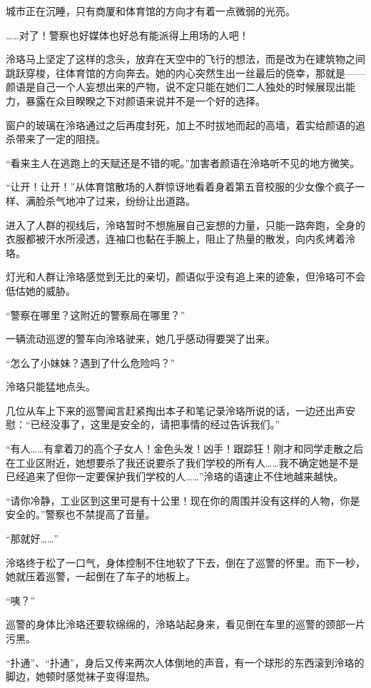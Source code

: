 \documentclass[UTF8, scheme = chinese, openany]{ctexbook}
\begin{document}
城市正在沉睡，只有商厦和体育馆的方向才有着一点微弱的光亮。

……对了！警察也好媒体也好总有能派得上用场的人吧！

泠珞马上坚定了这样的念头，放弃在天空中的飞行的想法，而是改为在建筑物之间跳跃穿梭，往体育馆的方向奔去。她的内心突然生出一丝最后的侥幸，那就是——颜语是自己一个人妄想出来的产物，说不定只能在她们二人独处的时候展现出能力，暴露在众目睽睽之下对颜语来说并不是一个好的选择。

窗户的玻璃在泠珞通过之后再度封死，加上不时拔地而起的高墙，着实给颜语的追杀带来了一定的阻挠。

“看来主人在逃跑上的天赋还是不错的呢。”加害者颜语在泠珞听不见的地方微笑。

\vspace{1.5em}

“让开！让开！”从体育馆散场的人群惊讶地看着身着第五音校服的少女像个疯子一样、满脸杀气地冲了过来，纷纷让出道路。

进入了人群的视线后，泠珞暂时不想施展自己妄想的力量，只能一路奔跑，全身的衣服都被汗水所浸透，连袖口也黏在手腕上，阻止了热量的散发，向内炙烤着泠珞。

灯光和人群让泠珞感觉到无比的亲切，颜语似乎没有追上来的迹象，但泠珞可不会低估她的威胁。

“警察在哪里？这附近的警察局在哪里？”

一辆流动巡逻的警车向泠珞驶来，她几乎感动得要哭了出来。

“怎么了小妹妹？遇到了什么危险吗？”

泠珞只能猛地点头。

几位从车上下来的巡警闻言赶紧掏出本子和笔记录泠珞所说的话，一边还出声安慰：“已经没事了，这里是安全的，请把事情的经过告诉我们。”

“有人……有拿着刀的高个子女人！金色头发！凶手！跟踪狂！刚才和同学走散之后在工业区附近，她想要杀了我还说要杀了我们学校的所有人……我不确定她是不是已经追来了但你一定要保护我们学校的人……”泠珞的语速止不住地越来越快。

“请你冷静，工业区到这里可是有十公里！现在你的周围并没有这样的人物，你是安全的。”警察也不禁提高了音量。

“那就好……”

泠珞终于松了一口气，身体控制不住地软了下去，倒在了巡警的怀里。而下一秒，她就压着巡警，一起倒在了车子的地板上。

“咦？”

巡警的身体比泠珞还要软绵绵的，泠珞站起身来，看见倒在车里的巡警的颈部一片污黑。

“扑通”、“扑通”，身后又传来两次人体倒地的声音，有一个球形的东西滚到泠珞的脚边，她顿时感觉袜子变得湿热。
\end{document}
